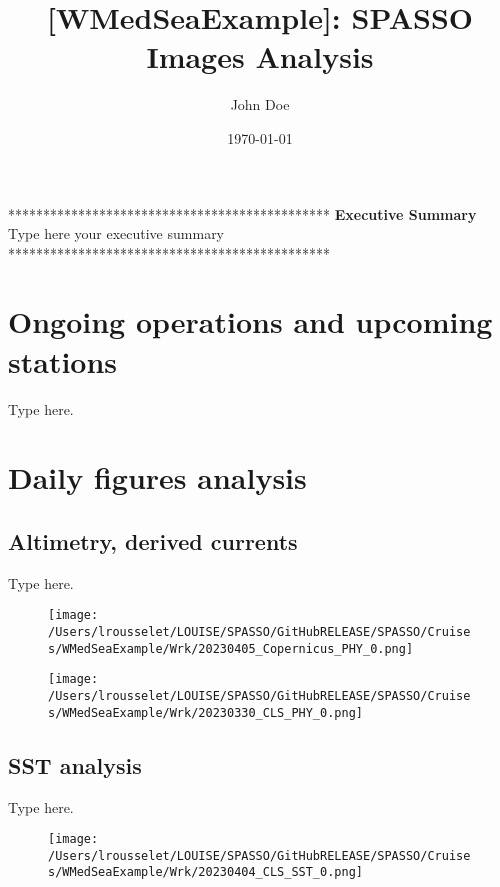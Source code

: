 \documentclass{article}%
\title{{[}WMedSeaExample{]}: SPASSO Images Analysis}%
\author{John Doe}%
\date{\today}%
\begin{document}
%
\normalsize%
\maketitle%
\begin{center}%
**********************************************%
\textbf{\newline%
Executive Summary}%
\newline%
\newline%
 Type here your executive summary\newline%
%
**********************************************%
\end{center}%
\section{Ongoing operations and upcoming stations}%
\label{sec:Ongoingoperationsandupcomingstations}%
Type here.

%
\section{Daily figures analysis}%
\label{sec:Dailyfiguresanalysis}%
\subsection{Altimetry, derived currents}%
\label{subsec:Altimetry,derivedcurrents}%
Type here.%


\begin{figure}[h!]%
\centering%
\texttt{[image: /Users/lrousselet/LOUISE/SPASSO/GitHubRELEASE/SPASSO/Cruises/WMedSeaExample/Wrk/20230405\_Copernicus\_PHY\_0.png]}%
\end{figure}

%


\begin{figure}[h!]%
\centering%
\texttt{[image: /Users/lrousselet/LOUISE/SPASSO/GitHubRELEASE/SPASSO/Cruises/WMedSeaExample/Wrk/20230330\_CLS\_PHY\_0.png]}%
\end{figure}

%
\clearpage

%
\subsection{SST analysis}%
\label{subsec:SSTanalysis}%
Type here.%


\begin{figure}[h!]%
\centering%
\texttt{[image: /Users/lrousselet/LOUISE/SPASSO/GitHubRELEASE/SPASSO/Cruises/WMedSeaExample/Wrk/20230404\_CLS\_SST\_0.png]}%
\end{figure}
\end{document}

